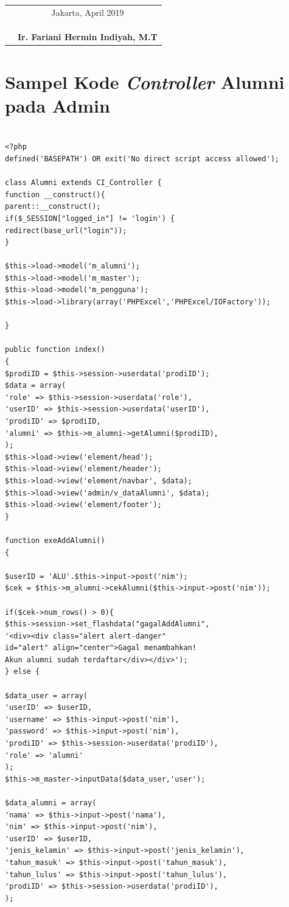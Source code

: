 \begin{tabular}{p{7.5cm}c}
	&Jakarta, April 2019\\
	&\\
	&\\
	&\\
	&\textbf{Ir. Fariani Hermin Indiyah, M.T}
\end{tabular}

\chapter{Sampel Kode \textit{Controller} Alumni pada Admin}

\begin{verbatim}

<?php
defined('BASEPATH') OR exit('No direct script access allowed');

class Alumni extends CI_Controller {
function __construct(){
parent::__construct();
if($_SESSION["logged_in"] != 'login') {
redirect(base_url("login"));
}

$this->load->model('m_alumni');
$this->load->model('m_master');
$this->load->model('m_pengguna');
$this->load->library(array('PHPExcel','PHPExcel/IOFactory'));

}

public function index()
{
$prodiID = $this->session->userdata('prodiID');
$data = array(
'role' => $this->session->userdata('role'),
'userID' => $this->session->userdata('userID'),
'prodiID' => $prodiID,
'alumni' => $this->m_alumni->getAlumni($prodiID),
);
$this->load->view('element/head');
$this->load->view('element/header');
$this->load->view('element/navbar', $data);
$this->load->view('admin/v_dataAlumni', $data);
$this->load->view('element/footer');
}

function exeAddAlumni()
{

$userID = 'ALU'.$this->input->post('nim');
$cek = $this->m_alumni->cekAlumni($this->input->post('nim'));

if($cek->num_rows() > 0){
$this->session->set_flashdata("gagalAddAlumni", 
'<div><div class="alert alert-danger" 
id="alert" align="center">Gagal menambahkan! 
Akun alumni sudah terdaftar</div></div>');
} else {

$data_user = array(
'userID' => $userID,
'username' => $this->input->post('nim'),
'password' => $this->input->post('nim'),
'prodiID' => $this->session->userdata('prodiID'),
'role' => 'alumni'
);
$this->m_master->inputData($data_user,'user');

$data_alumni = array(
'nama' => $this->input->post('nama'),
'nim' => $this->input->post('nim'),
'userID' => $userID,
'jenis_kelamin' => $this->input->post('jenis_kelamin'),
'tahun_masuk' => $this->input->post('tahun_masuk'),
'tahun_lulus' => $this->input->post('tahun_lulus'),
'prodiID' => $this->session->userdata('prodiID'),
);


\end{verbatim}
